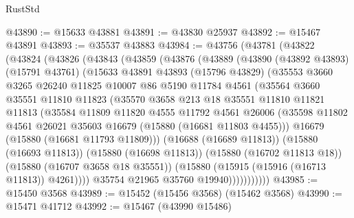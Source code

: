 \begin{lexlean}{RustStd}
\begin{coremodule}
@43890 := @15633 @43881
@43891 := @43830 @25937
@43892 := @15467 @43891
@43893 := @35537 @43883
@43984 := @43756
    (@43781
      (@43822
        (@43824
          (@43826
            (@43843
              (@43859
                (@43876
                  (@43889
                    (@43890
                      (@43892 @43893)
                      (@15791 @43761)
                      (@15633
                        @43891
                        @43893
                        (@15796 @43829)
                        (@35553
                          @3660
                          @3265
                          @26240
                          @11825
                          @10007
                          @86
                          @5190
                          @11784
                          @4561
                          (@35564
                            @3660
                            @35551
                            @11810
                            @11823
                            (@35570
                              @3658
                              @213
                              @18
                              @35551
                              @11810
                              @11821
                              @11813
                              (@35584
                                @11809
                                @11820
                                @4555
                                @11792
                                @4561
                                @26006
                                (@35598
                                  @11802
                                  @4561
                                  @26021
                                  @35603
                                  @16679
                                  (@15880 (@16681 @11803 @4455)))
                                @16679
                                (@15880 (@16681 @11793 @11809)))
                              (@16688 (@16689 @11813))
                              (@15880 (@16693 @11813))
                              (@15880 (@16698 @11813))
                              (@15880 (@16702 @11813 @18))
                              (@15880 (@16707 @3658 @18 @35551))
                              (@15880 (@15915 (@15916 (@16713 @11813)) @4261))))
                          @35754
                          @21965
                          @35760
                          @19940)))))))))))
@43985 := @15450 @3568
@43989 := @15452 (@15456 @3568) (@15462 @3568)
@43990 := @15471 @41712
@43992 := @15467 (@43990 @15486)

\end{coremodule}
\end{lexlean}
